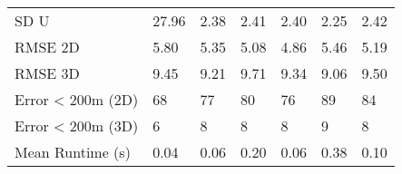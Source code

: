 \begin{longtable}{lllllll}
SD U              &      27.96 &       2.38 &      2.41 &     2.40 &     2.25 &        2.42 \\
RMSE 2D           &       5.80 &       5.35 &      5.08 &     4.86 &     5.46 &        5.19 \\
RMSE 3D           &       9.45 &       9.21 &      9.71 &     9.34 &     9.06 &        9.50 \\
Error < 200m (2D) &         68 &         77 &        80 &       76 &       89 &          84 \\
Error < 200m (3D) &          6 &          8 &         8 &        8 &        9 &           8 \\
Mean Runtime (s)  &       0.04 &       0.06 &      0.20 &     0.06 &     0.38 &        0.10 \\
\end{longtable}
